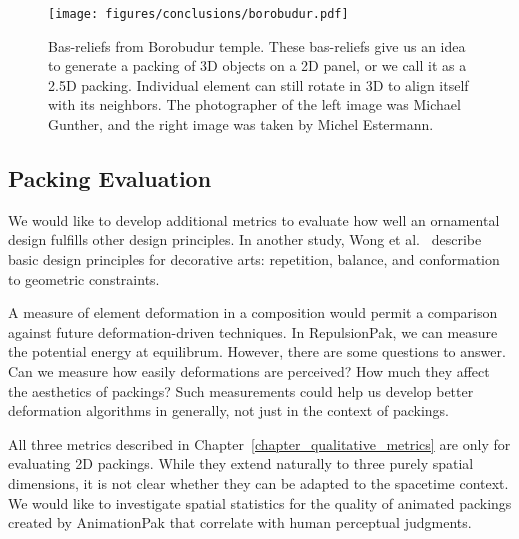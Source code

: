 \begin{figure}
\centering
\texttt{[image: figures/conclusions/borobudur.pdf]}
\caption[Element Arrangements in Bas-Reliefs]
{ \label{borobudur} 
\newtext
{
Bas-reliefs from Borobudur temple. These
bas-reliefs give us an idea to generate a packing of 3D objects on a 2D panel,
or we call it as a 2.5D packing.
Individual element can still rotate in 3D to align itself with its neighbors.
The photographer of the left image was Michael Gunther, and the right image was taken by Michel Estermann.
}
}
\end{figure}

\subsection{Packing Evaluation}

We would like to develop additional metrics to evaluate
how well an ornamental design fulfills other design principles.
In another study, Wong et al.~\cite{Wong1998} describe basic design
principles for decorative arts: repetition, balance, and conformation
to geometric constraints. 

A measure of element deformation in a composition would permit 
a comparison against future deformation-driven techniques.
In RepulsionPak, we can measure the potential energy at equilibrum.
However, there are some questions to answer.
Can we measure how easily deformations are perceived? How much they affect the aesthetics of packings?
Such measurements could help us develop better deformation algorithms in generally, not just in the context of packings.

All three metrics described in Chapter~\ref{chapter_qualitative_metrics} are only for evaluating 2D packings.
While they extend naturally to three purely spatial
dimensions, it is not clear whether they can be 
adapted to the spacetime context.  
We would like to investigate spatial statistics for the quality of animated packings created by AnimationPak that correlate
with human perceptual judgments.

